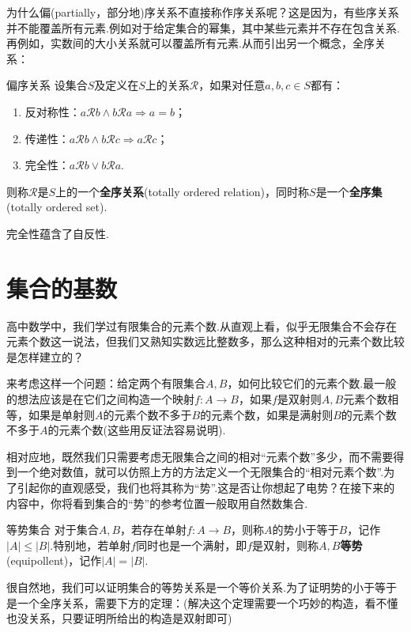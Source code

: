 \documentclass[lang=cn, zihao=5]{elegantbook}
\begin{document}
为什么偏(partially，部分地)序关系不直接称作序关系呢？这是因为，有些序关系并不能覆盖所有元素.例如对于给定集合的幂集，其中某些元素并不存在包含关系.再例如，实数间的大小关系就可以覆盖所有元素.从而引出另一个概念，全序关系：

\begin{definition}{偏序关系}
	设集合$S$及定义在$S$上的关系$\mathcal{R}$，如果对任意$a,b,c \in S$都有：
	\begin{enumerate}
		\item 反对称性：$a\mathcal{R} b \wedge b\mathcal{R} a \Rightarrow a=b$；
		\item 传递性：$a\mathcal{R} b \wedge b\mathcal{R} c \Rightarrow a\mathcal{R} c$；
		\item 完全性：$a\mathcal{R} b \vee b\mathcal{R} a$.
	\end{enumerate}
	则称$\mathcal{R}$是$S$上的一个\textbf{全序关系}(totally ordered relation)，同时称$S$是一个\textbf{全序集}(totally ordered set).
\end{definition}
\begin{remark}
	完全性蕴含了自反性.
\end{remark}


\section{集合的基数}

高中数学中，我们学过有限集合的元素个数.从直观上看，似乎无限集合不会存在元素个数这一说法，但我们又熟知实数远比整数多，那么这种相对的元素个数比较是怎样建立的？

来考虑这样一个问题：给定两个有限集合$A,B$，如何比较它们的元素个数.最一般的想法应该是在它们之间构造一个映射$f:A \to B$，如果$f$是双射则$A,B$元素个数相等，如果是单射则$A$的元素个数不多于$B$的元素个数，如果是满射则$B$的元素个数不多于$A$的元素个数(这些用反证法容易说明).

相对应地，既然我们只需要考虑无限集合之间的相对“元素个数”多少，而不需要得到一个绝对数值，就可以仿照上方的方法定义一个无限集合的“相对元素个数”.为了引起你的直观感受，我们也将其称为“势”.这是否让你想起了电势？在接下来的内容中，你将看到集合的“势”的参考位置一般取用自然数集合.

\begin{definition}{等势集合}
	对于集合$A,B$，若存在单射$f:A \to B$，则称$A$的势小于等于$B$，记作$|A| \leq |B|$.特别地，若单射$f$同时也是一个满射，即$f$是双射，则称$A,B$\textbf{等势}(equipollent)，记作$|A|=|B|$.
\end{definition}

很自然地，我们可以证明集合的等势关系是一个等价关系.为了证明势的小于等于是一个全序关系，需要下方的定理：(解决这个定理需要一个巧妙的构造，看不懂也没关系，只要证明所给出的构造是双射即可)
\end{document}

